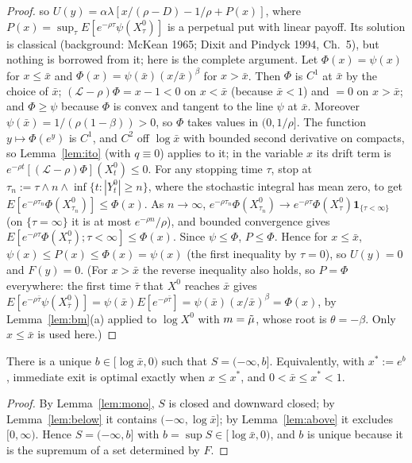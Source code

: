 \begin{proof}
so $U(y)=\alpha\lambda[x/(\rho-D)-1/\rho+P(x)]$, where $P(x)=\sup_\tau E[e^{-\rho\tau}\psi(X^0_\tau)]$ is a perpetual put with linear payoff. Its solution is classical (background: McKean 1965; Dixit and Pindyck 1994, Ch.~5), but nothing is borrowed from it; here is the complete argument. Let $\Phi(x)=\psi(x)$ for $x\le\bar x$ and $\Phi(x)=\psi(\bar x)(x/\bar x)^\beta$ for $x>\bar x$. Then $\Phi$ is $C^1$ at $\bar x$ by the choice of $\bar x$; $(\mathcal L-\rho)\Phi=x-1<0$ on $x<\bar x$ (because $\bar x<1$) and $=0$ on $x>\bar x$; and $\Phi\ge\psi$ because $\Phi$ is convex and tangent to the line $\psi$ at $\bar x$. Moreover $\psi(\bar x)=1/(\rho(1-\beta))>0$, so $\Phi$ takes values in $(0,1/\rho]$. The function $y\mapsto\Phi(e^y)$ is $C^1$, and $C^2$ off $\log\bar x$ with bounded second derivative on compacts, so Lemma~\ref{lem:ito} (with $q\equiv0$) applies to it; in the variable $x$ its drift term is $e^{-\rho t}[(\mathcal L-\rho)\Phi](X^0_t)\le0$. For any stopping time $\tau$, stop at $\tau_n:=\tau\wedge n\wedge\inf\{t:|Y^0_t|\ge n\}$, where the stochastic integral has mean zero, to get $E[e^{-\rho\tau_n}\Phi(X^0_{\tau_n})]\le\Phi(x)$. As $n\to\infty$, $e^{-\rho\tau_n}\Phi(X^0_{\tau_n})\to e^{-\rho\tau}\Phi(X^0_\tau)\mathbf 1_{\{\tau<\infty\}}$ (on $\{\tau=\infty\}$ it is at most $e^{-\rho n}/\rho$), and bounded convergence gives $E[e^{-\rho\tau}\Phi(X^0_\tau);\tau<\infty]\le\Phi(x)$. Since $\psi\le\Phi$, $P\le\Phi$. Hence for $x\le\bar x$, $\psi(x)\le P(x)\le\Phi(x)=\psi(x)$ (the first inequality by $\tau=0$), so $U(y)=0$ and $F(y)=0$. (For $x>\bar x$ the reverse inequality also holds, so $P=\Phi$ everywhere: the first time $\bar\tau$ that $X^0$ reaches $\bar x$ gives $E[e^{-\rho\bar\tau}\psi(X^0_{\bar\tau})]=\psi(\bar x)E[e^{-\rho\bar\tau}]=\psi(\bar x)(x/\bar x)^\beta=\Phi(x)$, by Lemma~\ref{lem:bm}(a) applied to $\log X^0$ with $m=\tilde\mu$, whose root is $\theta=-\beta$. Only $x\le\bar x$ is used here.)
\end{proof}

\begin{atheorem}\label{thm:threshold}
There is a unique $b\in[\log\bar x,0)$ such that $S=(-\infty,b]$. Equivalently, with $x^*:=e^b$, immediate exit is optimal exactly when $x\le x^*$, and $0<\bar x\le x^*<1$.
\end{atheorem}

\begin{proof}
By Lemma~\ref{lem:mono}, $S$ is closed and downward closed; by Lemma~\ref{lem:below} it contains $(-\infty,\log\bar x]$; by Lemma~\ref{lem:above} it excludes $[0,\infty)$. Hence $S=(-\infty,b]$ with $b=\sup S\in[\log\bar x,0)$, and $b$ is unique because it is the supremum of a set determined by $F$.
\end{proof}


